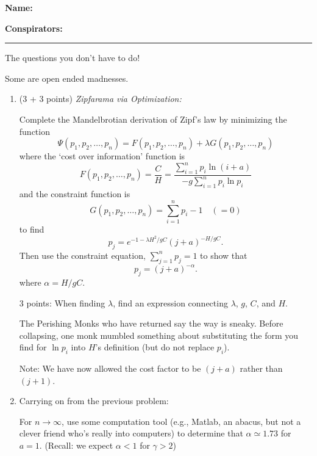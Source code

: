 \textbf{Name:} \\

\medskip

\textbf{Conspirators:} 

\medskip
\medskip

\hrule

\medskip


The questions you don't have to do!

Some are open ended madnesses.

\begin{enumerate}


\item (3 + 3 points)
  \textit{Zipfarama via Optimization:}

  Complete the Mandelbrotian derivation of Zipf's law by
  minimizing the function
  $$
  \Psi(p_1,p_2,\ldots,p_n) = 
  F(p_1,p_2,\ldots,p_n) + \lambda G(p_1,p_2,\ldots,p_n)
  $$
  where the `cost over information' function is
  $$
  F(p_1,p_2,\ldots,p_n)
  = 
  \frac{C}{H}
  =
  \frac{
    \sum_{i=1}^n p_i \ln (i+a)
  }{-g\sum_{i=1}^n p_i \ln p_i}
  $$
  and the
  constraint function is
  $$
  G(p_1,p_2,\ldots,p_n) = \sum_{i=1}^n p_i - 1  \quad (= 0)
  $$
  to find
  $$
  p_j = e^{-1 -\lambda H^2/gC} (j+a)^{-H/gC}.
  $$
  Then use the constraint equation, $\sum_{j=1}^{n} p_j = 1$ 
  to show that 
  $$
  p_j = (j+a)^{-\alpha}.
  $$
  where $\alpha = H/gC$.

  3 points: When finding $\lambda$, find an expression
  connecting $\lambda$, $g$, $C$, and $H$.

  The Perishing Monks who have returned say the way is sneaky.
  Before collapsing, one monk mumbled something
  about substituting the form you find
  for $\ln p_i$ into $H$'s definition (but
  do not replace $p_i$).

  Note: We have now allowed the cost factor to be $(j+a)$
  rather than $(j+1)$. 

  
   \solutionstart


   \solutionend

\item 
  Carrying on from the previous problem:

  For $n \rightarrow \infty$, use some computation tool (e.g., Matlab, an abacus, 
  but not a clever friend who's really into computers) 
  to determine that $\alpha \simeq 1.73$ for $a=1$.
  (Recall: we expect $\alpha < 1$ for $\gamma > 2$)

  
   \solutionstart


\end{enumerate}
